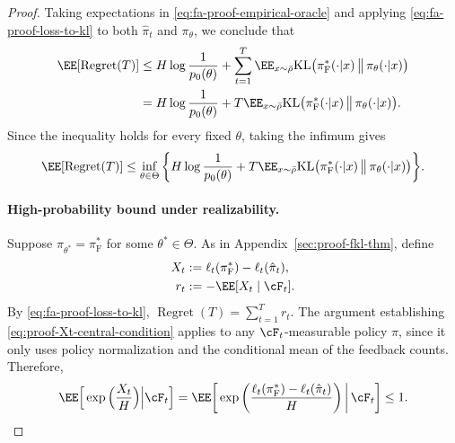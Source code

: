 \documentclass[11pt]{article}
\newcommand{\KL}{\text{KL}}
\newcommand{\pif}{\pi_{\mathrm{F}}}
\begin{document}
\begin{proof}
Taking expectations in \eqref{eq:fa-proof-empirical-oracle} and
applying \eqref{eq:fa-proof-loss-to-kl} to both $\hat\pi_t$ and
$\pi_\theta$, we conclude that
\begin{align*}
    \EE[\operatorname{Regret}(T)]
    &\leq
    H\log\frac1{p_0(\theta)}
    +
    \sum_{t=1}^T
    \EE_{x\sim\bar\rho}
    \KL\big(
        \pif^*(\cdot|x)
        \,\big\|\,
        \pi_\theta(\cdot|x)
    \big)\\
    &=
    H\log\frac1{p_0(\theta)}
    +
    T\EE_{x\sim\bar\rho}
    \KL\big(
        \pif^*(\cdot|x)
        \,\big\|\,
        \pi_\theta(\cdot|x)
    \big).
\end{align*}
Since the inequality holds for every fixed $\theta$, taking the infimum gives
\begin{align}
    \EE[\operatorname{Regret}(T)]
    \leq
    \inf_{\theta\in\Theta}
    \bigg\{
        H\log\frac1{p_0(\theta)}
        +
        T\EE_{x\sim\bar\rho}
        \KL\big(
            \pif^*(\cdot|x)
            \,\big\|\,
            \pi_\theta(\cdot|x)
        \big)
    \bigg\}.
    \label{eq:fa-proof-oracle}
\end{align}

\paragraph{High-probability bound under realizability.}
Suppose $\pi_{\theta^*}=\pif^*$ for some $\theta^*\in\Theta$.
As in Appendix~\ref{sec:proof-fkl-thm}, define
\begin{align*}
    X_t
    &:=
    \ell_t(\pif^*)-\ell_t(\hat\pi_t),\\
    r_t
    &:=
    -\EE[X_t\mid\cF_t].
\end{align*}
By \eqref{eq:fa-proof-loss-to-kl},
$\operatorname{Regret}(T)=\sum_{t=1}^T r_t$. The argument establishing \eqref{eq:proof-Xt-central-condition}
applies to any $\cF_t$-measurable policy $\pi$, since it only
uses policy normalization and the conditional mean of the
feedback counts. Therefore,
\begin{align}
    \EE\Big[\exp\Big(\frac{X_t}{H}\Big)\Big| \cF_t\Big] = \EE\bigg[
        \exp\bigg(
            \frac{\ell_t(\pif^*)-\ell_t(\hat\pi_t)}H
        \bigg)
        \,\bigg|\,\cF_t
    \bigg]
    \leq1.
    \label{eq:fa-hp-central}
\end{align}


\end{proof}
\end{document}
